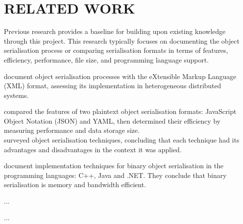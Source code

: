 \documentclass[../report.tex]{subfiles}
\begin{document}
\section{RELATED WORK} %

Previous research provides a baseline for building upon existing knowledge through this project. This research typically focuses on documenting the object serialisation process or comparing serialisation formats in terms of features, efficiency, performance, file size, and programming language support.

\cite{goff2001xmlserialization} document object serialisation processes with the eXtensible Markup Language (XML) format, assessing its implementation in heterogeneous distributed systems.

\cite{eriksson2011comparison} compared the features of two plaintext object serialisation formats: JavaScript Object Notation (JSON) and YAML, then determined their efficiency by measuring performance and data storage size. \\
\cite{kazuaki2011survey} surveyed object serialisation techniques, concluding that each technique had its advantages and disadvantages in the context it was applied.

\cite{tauro2012binary} document implementation techniques for binary object serialisation in the programming languages: C++, Java and .NET. They conclude that binary serialisation is memory and bandwidth efficient.

\cite{sumaray2012efficiency} ...

\cite{vanura2018performance} ...
\end{document}
